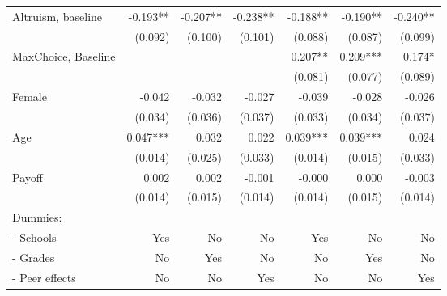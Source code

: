 \begin{table}[htbp]
\begin{adjustbox}{width=1\textwidth}
\begin{threeparttable}
\begin{tabular}{l*{6}{D{.}{.}{-1}}}
Altruism, baseline  &              -0.193** &              -0.207** &              -0.238** &              -0.188** &              -0.190** &              -0.240** \\
                    &             (0.092)   &             (0.100)   &             (0.101)   &             (0.088)   &             (0.087)   &             (0.099)   \\
MaxChoice, Baseline &                       &                       &                       &               0.207** &               0.209***&               0.174*  \\
                    &                       &                       &                       &             (0.081)   &             (0.077)   &             (0.089)   \\
Female              &              -0.042   &              -0.032   &              -0.027   &              -0.039   &              -0.028   &              -0.026   \\
                    &             (0.034)   &             (0.036)   &             (0.037)   &             (0.033)   &             (0.034)   &             (0.037)   \\
Age                 &               0.047***&               0.032   &               0.022   &               0.039***&               0.039***&               0.024   \\
                    &             (0.014)   &             (0.025)   &             (0.033)   &             (0.014)   &             (0.015)   &             (0.033)   \\
Payoff              &               0.002   &               0.002   &              -0.001   &              -0.000   &               0.000   &              -0.003   \\
                    &             (0.014)   &             (0.015)   &             (0.014)   &             (0.014)   &             (0.015)   &             (0.014)   \\ \midrule 
Dummies: &&&&&& \\
- Schools             &                 Yes   &                  No   &                  No   &                 Yes   &                  No   &                  No   \\
- Grades              &                  No   &                 Yes   &                  No   &                  No   &                 Yes   &                  No   \\
- Peer effects        &                  No   &                  No   &                 Yes   &                  No   &                  No   &                 Yes   \\

\end{tabular}
\end{threeparttable}
\end{adjustbox}
\end{table}
